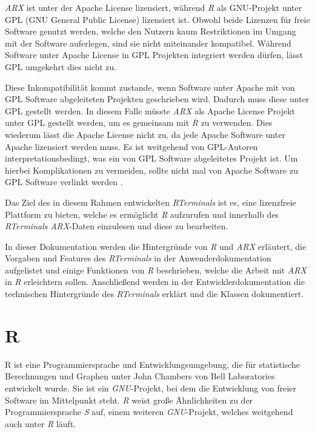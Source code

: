 \documentclass[a4paper, 12pt]{report} %
\begin{document}

\textit{ARX} ist unter der Apache License lizensiert, während \textit{R} als GNU-Projekt unter GPL (GNU General Public License) lizensiert ist. 
Obwohl beide Lizenzen für freie Software genutzt werden, welche den Nutzern kaum Restriktionen im Umgang mit der Software auferlegen, sind sie nicht miteinander kompatibel. Während Software unter Apache License in GPL Projekten integriert werden dürfen, lässt GPL umgekehrt dies nicht zu. 

Diese Inkompatibilität kommt zustande, wenn Software unter Apache mit von GPL Software abgeleiteten Projekten geschrieben wird. Dadurch muss diese unter GPL gestellt werden. In diesem Falle müsste \textit{ARX} als Apache License Projekt unter GPL gestellt werden, um es gemeinsam mit \textit{R} zu verwenden. Dies wiederum lässt die Apache License nicht zu, da jede Apache Software unter Apache lizensiert werden muss. Es ist weitgehend von GPL-Autoren interpretationsbedingt, was ein von GPL Software abgeleitetes Projekt ist. Um hierbei Komplikationen zu vermeiden, sollte nicht mal von Apache Software zu GPL Software verlinkt werden \cite{license}. 

Das Ziel des in diesem Rahmen entwickelten \textit{RTerminals} ist es, eine lizenzfreie Plattform zu bieten, welche es ermöglicht \textit{R} aufzurufen und innerhalb des \textit{RTerminals} \textit{ARX}-Daten einzulesen und diese zu bearbeiten.

In dieser Dokumentation werden die Hintergründe von \textit{R} und \textit{ARX} erläutert, die Vorgaben und Features des \textit{RTerminals} in der Anwenderdokumentation aufgelistet und einige Funktionen von \textit{R} beschrieben, welche die Arbeit mit \textit{ARX} in \textit{R} erleichtern sollen. Anschließend werden in der Entwicklerdokumentation die technischen Hintergründe des \textit{RTerminals} erklärt und die Klassen dokumentiert.

\section*{R}\label{r}
R ist eine Programmiersprache und Entwicklungsumgebung, die für statistische Berechnungen und Graphen unter John Chambers von Bell Laboratories entwickelt wurde. Sie ist ein \textit{GNU}-Projekt, bei dem die Entwicklung von freier Software im Mittelpunkt steht. \textit{R} weist große Ähnlichkeiten zu der Programmiersprache \textit{S} auf, einem weiteren \textit{GNU}-Projekt, welches weitgehend auch unter \textit{R} läuft. \cite{rproject}
\end{document}
